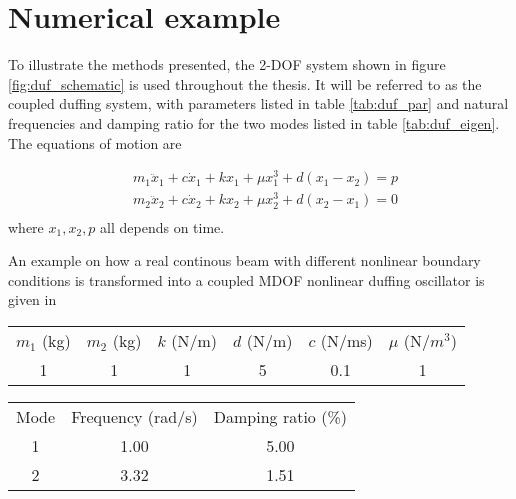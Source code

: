 
\section{Numerical example}
\label{sec:numerical-example}


To illustrate the methods presented, the 2-DOF system shown in figure
\ref{fig:duf_schematic} is used throughout the thesis. It will be referred to as
the coupled duffing system, with parameters listed in table \ref{tab:duf_par}
and natural frequencies and damping ratio for the two modes listed in table
\ref{tab:duf_eigen}. The equations of motion are

\begin{equation}
  \label{eq:2dof}
  \begin{aligned}
    &m_1\ddot x_1 + c \dot x_1 + kx_1 + \mu x_1^3 + d(x_1 - x_2) = p \\
    &m_2\ddot x_2 + c \dot x_2 + kx_2 + \mu x_2^3 + d(x_2 - x_1) = 0 \\
  \end{aligned}
\end{equation}
where $x_1,x_2, p$ all depends on time.

An example on how a real continous beam with different nonlinear boundary
conditions is transformed into a coupled MDOF nonlinear duffing oscillator is
given in \textcite{mhermansen2017a}


\begin{center}
  \begin{tabular}{*{6}{c}}
    \hline
    $m_1$ (kg) & $m_2$ (kg) & $k$ (N/m) & $d$ (N/m) & $c$ (N/ms) & $\mu$ (N/$m^3$) \\
    1 & 1 & 1 & 5 & 0.1 & 1 \\
    \hline
  \end{tabular}
  \label{tab:duf_par}
\end{center}


\begin{center}
  \begin{tabular}{*{3}{c}}
    \hline
    Mode & Frequency (rad/s) & Damping ratio (\%) \\
    1 & 1.00 & 5.00 \\
    2 & 3.32 & 1.51 \\
    \hline
  \end{tabular}
  \label{tab:duf_eigen}
\end{center}


